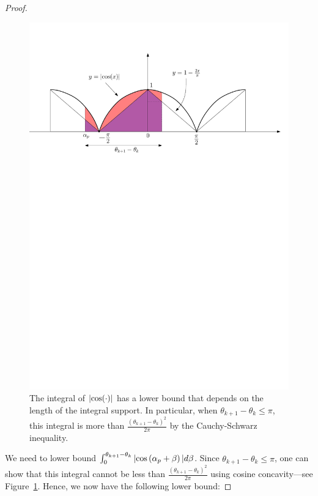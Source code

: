 \begin{proof}
\begin{figure}\begin{center} 
\includegraphics[width=15cm]{figures/cosineConcavity}
\caption[Concavity argument]{\label{fig:cosineConc}
The integral of $|{\rm cos}(\cdot)|$ has a lower bound that depends on the length of the integral support.
In particular, when $\theta_{k+1}-\theta_k\leq\pi$, this integral is more than $\frac{\left(\theta_{k+1}-\theta_k\right)^2}{2\pi}$ 
by the Cauchy-Schwarz inequality.}
\end{center}\end{figure}

We need to lower bound $\int_0^{\theta_{k+1}-\theta_k}|{\rm cos}\left(\alpha_p+\beta\right)|d\beta$.
Since $\theta_{k+1}-\theta_k\leq\pi$, one can show that this integral cannot be less than $\frac{\left(\theta_{k+1}-\theta_k\right)^2}{2\pi}$ 
using cosine concavity---see Figure~\ref{fig:cosineConc}. 
Hence, we now have the following lower bound:
 

\end{proof}
